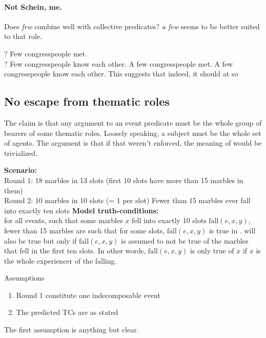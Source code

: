 \documentclass[english]{article}
\begin{document}
\paragraph{Not Schein, me.} Does \emph{few} combine well with collective predicates? \emph{a few} seems to be better suited to that role.

\pex
\a 
? Few congresspeople met.\\
? Few congresspeople know each other.
\a 
A few congresspeople met.
A few congresspeople know each other.
\xe
%
This suggests that indeed, it should at so

\subsection{No escape from thematic roles}

The claim is that any argument to an event predicate must be the whole group of bearers of some thematic roles. Loosely speaking, a subject must be the whole set of agents. The argument is that if that weren't enforced, the meaning of \cnextx would be trivialized.

\pex
\a \textbf{Scenario:} \\
Round 1: 18 marbles in 13 slots (first 10 slots have more than 15 marbles in them) \\
Round 2: 10 marbles in 10 slots (= 1 per slot)
\a Fewer than 15 marbles ever fall into exactly ten slots
\a \textbf{Model truth-conditions:} \\
for all events, such that some marbles $x$ fell into exactly 10 slots $\text{fall}(e, x, y)$,
fewer than 15 marbles are such that for some slots, $\text{fall}(e, x, y)$
\xe
%
 is true in .  will also be true but only if $\text{fall}(e, x, y)$ is assumed to not be true of the marbles that fell in the first ten slots. In other words, $\text{fall}(e, x, y)$ is only true of $x$ if $x$ is the whole experiencer of the falling.

\begin{boxy}{Assumptions}
\begin{enumerate}
\item Round 1 constitute one indecomposable event
\item The predicted TCs are as stated
\end{enumerate}
\end{boxy}
%
The first assumption is anything but clear. 
\end{document}
